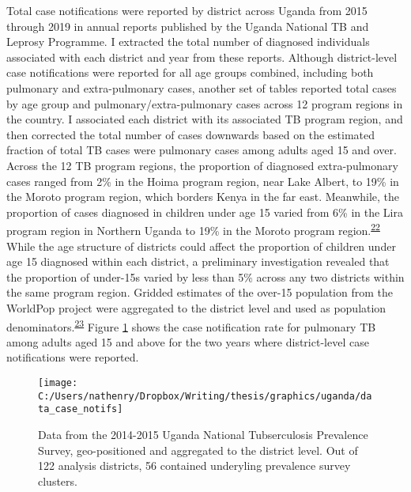 \documentclass[
]{article}
\begin{document}
Total case notifications were reported by district across Uganda from 2015 through 2019 in annual reports published by the Uganda National TB and Leprosy Programme. I extracted the total number of diagnosed individuals associated with each district and year from these reports. Although district-level case notifications were reported for all age groups combined, including both pulmonary and extra-pulmonary cases, another set of tables reported total cases by age group and pulmonary/extra-pulmonary cases across 12 program regions in the country. I associated each district with its associated TB program region, and then corrected the total number of cases downwards based on the estimated fraction of total TB cases were pulmonary cases among adults aged 15 and over. Across the 12 TB program regions, the proportion of diagnosed extra-pulmonary cases ranged from 2\% in the Hoima program region, near Lake Albert, to 19\% in the Moroto program region, which borders Kenya in the far east. Meanwhile, the proportion of cases diagnosed in children under age 15 varied from 6\% in the Lira program region in Northern Uganda to 19\% in the Moroto program region.\textsuperscript{\protect\hyperlink{ref-UgandaNationalTuberculosisandLeprosyProgramme2018}{22}} While the age structure of districts could affect the proportion of children under age 15 diagnosed within each district, a preliminary investigation revealed that the proportion of under-15s varied by less than 5\% across any two districts within the same program region. Gridded estimates of the over-15 population from the WorldPop project were aggregated to the district level and used as population denominators.\textsuperscript{\protect\hyperlink{ref-Tatem2017}{23}} Figure \ref{fig:data-case-notifs} shows the case notification rate for pulmonary TB among adults aged 15 and above for the two years where district-level case notifications were reported.

\begin{figure}[!ht]

{\centering \texttt{[image: C:/Users/nathenry/Dropbox/Writing/thesis/graphics/uganda/data\_case\_notifs]} 

}

\caption{Data from the 2014-2015 Uganda National Tubserculosis Prevalence Survey, geo-positioned and aggregated to the district level. Out of 122 analysis districts, 56 contained underyling prevalence survey clusters.}\label{fig:data-case-notifs}
\end{figure}
\end{document}
